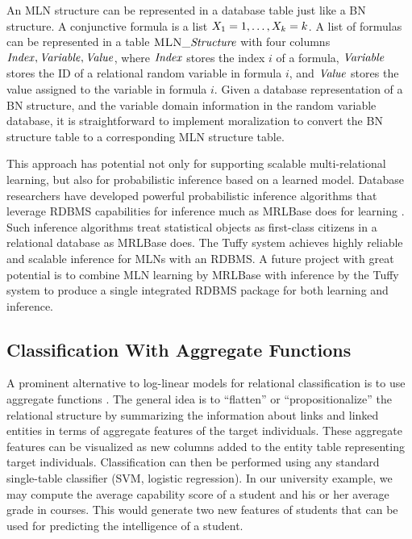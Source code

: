 \documentclass{acm_proc_article-sp}
\begin{document}
An MLN structure can be represented in a database table just like a BN structure. A conjunctive formula is a list $\node_{1} = \value_{1},\ldots,\node_{k} = \value_{k}$. A list of formulas can be represented in a table $\textsc{MLN}\_\it{Structure}$ with four columns $\it{Index},\it{Variable},\it{Value}$, where $\it{Index}$ stores the index $i$ of a formula, $\it{Variable}$ stores the ID of a relational random variable in formula $i$, and $\it{Value}$ stores the value assigned to the variable in formula $i$. Given a database representation of a BN structure, and the variable domain information in the random variable database, it is straightforward to implement moralization to convert the BN structure table to a corresponding MLN structure table. 

This approach has potential not only for supporting scalable multi-relational learning, but also for probabilistic inference based on a learned model. Database researchers have developed powerful probabilistic inference algorithms that leverage RDBMS capabilities for inference much as MRLBase does for learning \cite{Bayestore,Tuffy}. Such inference algorithms treat statistical objects as first-class citizens in a relational database as MRLBase does. The Tuffy system achieves highly reliable and scalable inference for MLNs with an RDBMS. A future project with great potential is to combine MLN learning by MRLBase with inference by the Tuffy system to produce a single integrated RDBMS package for both learning and inference. 

\subsection{Classification With Aggregate Functions}

A prominent alternative to log-linear models for relational classification is to use aggregate functions \cite{prms,survey,treeliker}. The general idea is to ``flatten'' or ``propositionalize'' the relational structure by summarizing the information about links and linked entities in terms of aggregate features of the target individuals. These aggregate features can be visualized as new columns added to the entity table representing target individuals. Classification can then be performed using any standard single-table classifier (SVM, logistic regression). In our university example, we may compute the average capability score of a student and his or her average grade in courses. This would generate two new features of students that can be used for predicting the intelligence of a student.  
\end{document}
